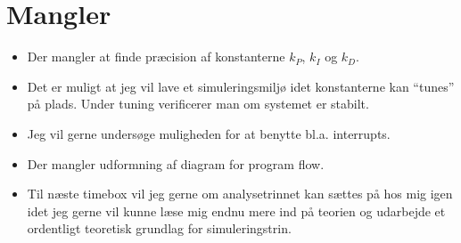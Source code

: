 \documentclass{article}
\begin{document}
\section{Mangler}
\label{sec:mangler}

\begin{itemize}
\item Der mangler at finde præcision af konstanterne $k_P$, $k_I$ og $k_D$.
\item Det er muligt at jeg vil lave et simuleringsmiljø idet konstanterne kan ``tunes'' på plads. Under tuning verificerer man om systemet er stabilt.
\item Jeg vil gerne undersøge muligheden for at benytte bl.a. interrupts.
\item Der mangler udformning af diagram for program flow.
\item Til næste timebox vil jeg gerne om analysetrinnet kan sættes på hos mig igen idet jeg gerne vil kunne læse mig endnu mere ind på teorien og udarbejde et ordentligt teoretisk grundlag for simuleringstrin.
\end{itemize}
\end{document}

